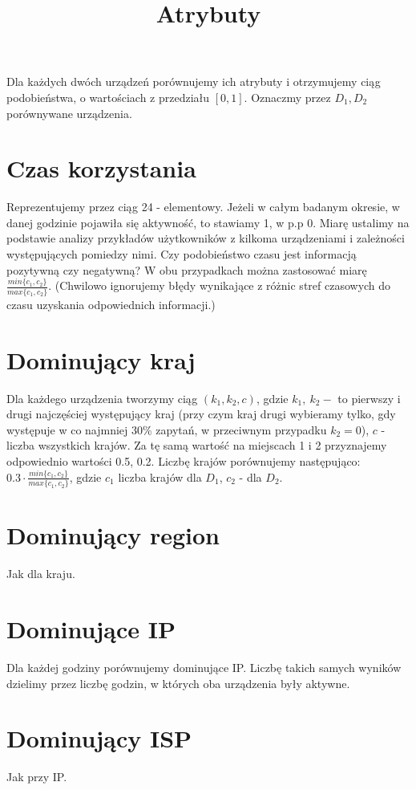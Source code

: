 \documentclass[a4paper,11pt]{article}
\date{ }
\begin{document}
\title{\textbf{Atrybuty}}

\maketitle

Dla każdych dwóch urządzeń porównujemy ich atrybuty i otrzymujemy ciąg podobieństwa, o wartościach z przedziału $[0,1]$. 
Oznaczmy przez $D_1,D_2$ porównywane urządzenia.

\section{{\color{red} Czas korzystania}}
	Reprezentujemy przez ciąg 24 - elementowy. Jeżeli w całym badanym okresie, w danej godzinie pojawiła się aktywność, to stawiamy 1, w p.p 0. Miarę ustalimy na podstawie analizy przykładów użytkowników z kilkoma urządzeniami i zależności występujących pomiedzy nimi. Czy podobieństwo czasu jest informacją pozytywną czy negatywną? W obu przypadkach można zastosować miarę  $\frac{min\{c_1,c_2\}}{max\{c_1,c_2\}}$. (Chwilowo ignorujemy błędy wynikające z różnic stref czasowych do czasu uzyskania odpowiednich informacji.)
	
\section{Dominujący kraj}
	Dla każdego urządzenia tworzymy ciąg $(k_1,k_2,c)$, gdzie $k_1,\ k_2-$ to pierwszy i drugi najczęściej występujący kraj (przy czym kraj drugi wybieramy tylko, gdy występuje w co najmniej 30\% zapytań, w przeciwnym przypadku $k_2=0$), $c$ - liczba wszystkich krajów. Za tę samą wartość na miejscach 1 i 2 przyznajemy odpowiednio wartości 0.5, 0.2. Liczbę krajów porównujemy następująco: $0.3\cdot\frac{min\{c_1,c_2\}}{max\{c_1,c_2\}}$, gdzie $c_1$ liczba krajów dla $D_1$, $c_2$ - dla $D_2$. 

\section{Dominujący region}
	Jak dla kraju.

\section{Dominujące IP}
	Dla każdej godziny porównujemy dominujące IP. Liczbę takich samych wyników dzielimy przez liczbę godzin, w których oba urządzenia były aktywne.

\section{Dominujący ISP}
	Jak przy IP.
\end{document}

